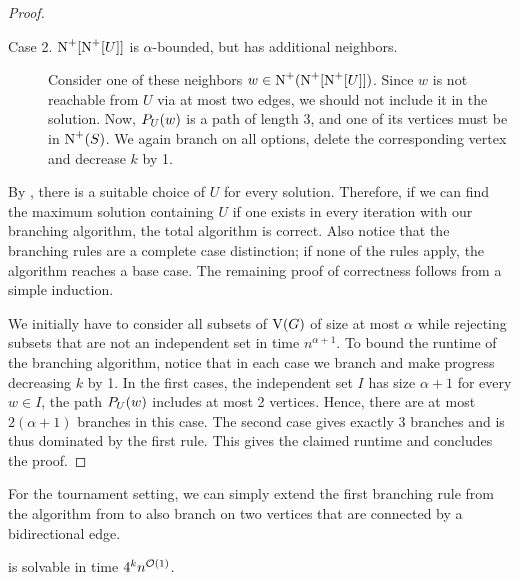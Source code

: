 \begin{lemma}
\begin{proof}
\begin{description}
        \medskip
        \item[Case 2. $\operatorname{\operatorname{N}^+}[{\operatorname{\operatorname{N}^+}[{U}]}]$ is $\alpha$-bounded, but has additional neighbors.] Consider one of these neighbors $w \in \operatorname{\operatorname{N}^+}({\operatorname{\operatorname{N}^+}[{\operatorname{\operatorname{N}^+}[{U}]}]})$.
        Since $w$ is not reachable from $U$ via at most two edges, we should not include it in the solution. Now, $P_{U}({w})$ is a path of length 3, and one of its vertices must be in $\operatorname{\operatorname{N}^+}({S})$. We again branch on all options, delete the corresponding vertex and decrease $k$ by 1.
    \end{description}

    By , there is a suitable choice of $U$ for every solution. Therefore, if we can find the maximum solution containing $U$ if one exists in every iteration with our branching algorithm, the total algorithm is correct.
    Also notice that the branching rules are a complete case distinction; if none of the rules apply, the algorithm reaches a base case.
    The remaining proof of correctness follows from a simple induction.

    We initially have to consider all subsets of $\operatorname{V}({G})$ of size at most $\alpha$ while rejecting subsets that are not an independent set in time $n^{\alpha+1}$.
    To bound the runtime of the branching algorithm, notice that in each case we branch and make progress decreasing $k$ by 1.
    In the first cases, the independent set $I$ has size $\alpha + 1$ for every $w \in I$, the path $P_{U}({w})$ includes at most 2 vertices. Hence, there are at most $2(\alpha + 1)$ branches in this case. The second case gives exactly 3 branches and is thus dominated by the first rule.  This gives the claimed runtime and concludes the proof. 
\end{proof}
\fi

For the tournament setting, we can simply extend the first branching rule from the algorithm from  to also branch on two vertices that are connected by a bidirectional edge.

\begin{theorem}
   is solvable in time $4^kn^{\mathcal{O}(1)}$.
\end{theorem}

\begin{comment}
\iflong
In undirected graphs, the situation is simpler. Instead of \Cref{lem:ind_set_reaches}, clearly any maximum size independent set reaches every vertex via a single edge. Therefore, when adapting the algorithm from \Cref{thm:alpha_bounded_fpt}, the first rule has at most $\alpha + 1$ branches and the second rule now has at most $2$ branches. This gives us the following corollary, which also generalizes \Cref{thm:secluded_clique_fpt}.


\end{comment}
\end{lemma}

